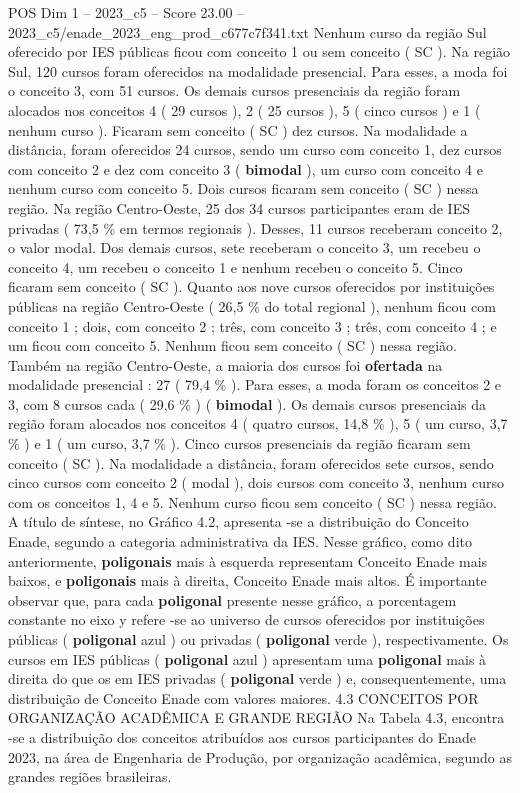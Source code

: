\begin{textsample}{POS Dim 1 – 2023\_c5 – Score 23.00 – 2023\_c5/enade\_2023\_eng\_prod\_c677c7f341.txt}
Nenhum curso da região Sul oferecido por IES públicas ficou com conceito 1 ou sem conceito ( SC ).
Na região Sul, 120 cursos foram oferecidos na modalidade presencial.
Para esses, a moda foi o conceito 3, com 51 cursos.
Os demais cursos presenciais da região foram alocados nos conceitos 4 ( 29 cursos ), 2 ( 25 cursos ), 5 ( cinco cursos ) e 1 ( nenhum curso ).
Ficaram sem conceito ( SC ) dez cursos.
Na modalidade a distância, foram oferecidos 24 cursos, sendo um curso com conceito 1, dez cursos com conceito 2 e dez com conceito 3 ( \textbf{bimodal} ), um curso com conceito 4 e nenhum curso com conceito 5.
Dois cursos ficaram sem conceito ( SC ) nessa região.
Na região Centro-Oeste, 25 dos 34 cursos participantes eram de IES privadas ( 73,5 \% em termos regionais ).
Desses, 11 cursos receberam conceito 2, o valor modal.
Dos demais cursos, sete receberam o conceito 3, um recebeu o conceito 4, um recebeu o conceito 1 e nenhum recebeu o conceito 5.
Cinco ficaram sem conceito ( SC ).
Quanto aos nove cursos oferecidos por instituições públicas na região Centro-Oeste ( 26,5 \% do total regional ), nenhum ficou com conceito 1 ; dois, com conceito 2 ; três, com conceito 3 ; três, com conceito 4 ; e um ficou com conceito 5.
Nenhum ficou sem conceito ( SC ) nessa região.
Também na região Centro-Oeste, a maioria dos cursos foi \textbf{ofertada} na modalidade presencial : 27 ( 79,4 \% ).
Para esses, a moda foram os conceitos 2 e 3, com 8 cursos cada ( 29,6 \% ) ( \textbf{bimodal} ).
Os demais cursos presenciais da região foram alocados nos conceitos 4 ( quatro cursos, 14,8 \% ), 5 ( um curso, 3,7 \% ) e 1 ( um curso, 3,7 \% ).
Cinco cursos presenciais da região ficaram sem conceito ( SC ).
Na modalidade a distância, foram oferecidos sete cursos, sendo cinco cursos com conceito 2 ( modal ), dois cursos com conceito 3, nenhum curso com os conceitos 1, 4 e 5.
Nenhum curso ficou sem conceito ( SC ) nessa região.
A título de síntese, no Gráfico 4.2, apresenta -se a distribuição do Conceito Enade, segundo a categoria administrativa da IES.
Nesse gráfico, como dito anteriormente, \textbf{poligonais} mais à esquerda representam Conceito Enade mais baixos, e \textbf{poligonais} mais à direita, Conceito Enade mais altos.
É importante observar que, para cada \textbf{poligonal} presente nesse gráfico, a porcentagem constante no eixo y refere -se ao universo de cursos oferecidos por instituições públicas ( \textbf{poligonal} azul ) ou privadas ( \textbf{poligonal} verde ), respectivamente.
Os cursos em IES públicas ( \textbf{poligonal} azul ) apresentam uma \textbf{poligonal} mais à direita do que os em IES privadas ( \textbf{poligonal} verde ) e, consequentemente, uma distribuição de Conceito Enade com valores maiores. 4.3 CONCEITOS POR ORGANIZAÇÃO ACADÊMICA E GRANDE REGIÃO Na Tabela 4.3, encontra -se a distribuição dos conceitos atribuídos aos cursos participantes do Enade 2023, na área de Engenharia de Produção, por organização acadêmica, segundo as grandes regiões brasileiras.

\end{textsample}
